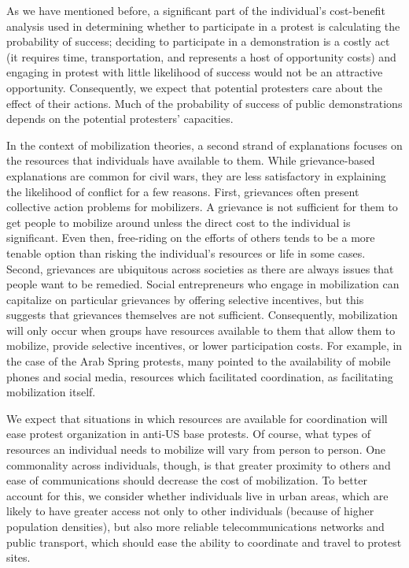 		As we have mentioned before, a significant part of the individual's cost-benefit analysis used in determining whether to participate in a protest is calculating the probability of success; deciding to participate in a demonstration is a costly act (it requires time, transportation, and represents a host of opportunity costs) and engaging in protest with little likelihood of success would not be an attractive opportunity. Consequently, we expect that potential protesters care about the effect of their actions. Much of the probability of success of public demonstrations depends on the potential protesters' capacities. 
		
		In the context of mobilization theories, a second strand of explanations focuses on the resources that individuals have available to them. While grievance-based explanations are common for civil wars, they are less satisfactory in explaining the likelihood of conflict for a few reasons. First, grievances often present collective action problems for mobilizers. A grievance is not sufficient for them to get people to mobilize around unless the direct cost to the individual is significant. Even then, free-riding on the efforts of others tends to be a more tenable option than risking the individual's resources or life in some cases.\cite{lichbach1993} Second, grievances are ubiquitous across societies as there are always issues that people want to be remedied. Social entrepreneurs who engage in mobilization can capitalize on particular grievances by offering selective incentives, but this suggests that grievances themselves are not sufficient.  Consequently, mobilization will only occur when groups have resources available to them that allow them to mobilize, provide selective incentives, or lower participation costs.\cite{Olson1965,Tilly1973,Khawaja1994} For example, in the case of the Arab Spring protests, many pointed to the availability of mobile phones and social media, resources which facilitated coordination, as facilitating mobilization itself.\cite[][Similarly, during the Iranian Revolution, opportunities for social gathering also led to increased protest mobilization.]{Hussain2013,Rasler1996}
		
		
		We expect that situations in which resources are available for coordination will ease protest organization in anti-US base protests. Of course, what types of resources an individual needs to mobilize will vary from person to person. One commonality across individuals, though, is that greater proximity to others and ease of communications should decrease the cost of mobilization. To better account for this, we consider whether individuals live in urban areas, which are likely to have greater access not only to other individuals (because of higher population densities), but also more reliable telecommunications networks and public transport, which should ease the ability to coordinate and travel to protest sites. 
		
